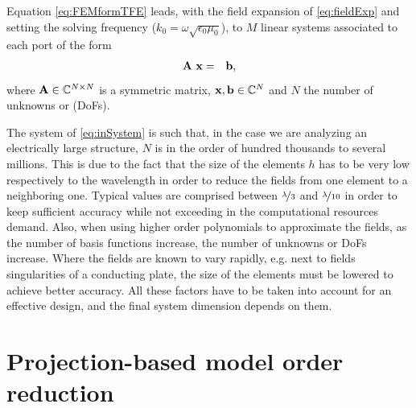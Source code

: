 \par Equation \eqref{eq:FEMformTFE} leads, with the field expansion of \eqref{eq:fieldExp} and setting the solving frequency ($k_0 = \omega\sqrt{\epsilon_0 \mu_0}$), to $M$ linear systems associated to each port of the form \cite{JinFEME,PelosiCoccioliSelleriQFEEF}
\begin{eqnarray}
\label{eq:inSystem}
\mat{A} \ \vect{x}  & = & \vect{b},
\end{eqnarray} where $\mathbf{A} \in \mathbb{C}^{N \times N}$ is a symmetric matrix, $\vect{x}, \vect{b} \in \mathbb{C}^{N}$ and $N$ the number of unknowns or  (DoFs).
\par The system of \eqref{eq:inSystem} is such that, in the case we are analyzing an electrically large structure, $N$ is in the order of hundred thousands to several millions. This is due to the fact that the size of the elements $h$ has to be very low respectively to the wavelength in order to reduce the fields  from one element to a neighboring one. Typical values are comprised between $\nicefrac{\lambda}{3}$ and $\nicefrac{\lambda}{10}$ in order to keep sufficient accuracy while not exceeding in the computational resources demand. Also, when using higher order polynomials to approximate the fields, as the number of basis functions increase, the number of unknowns or DoFs increase. Where the fields are known to vary rapidly, e.g. next to fields singularities of a conducting plate, the size of the elements must be lowered to achieve better accuracy. All these factors have to be taken into account for an effective design, and the final system dimension depends on them.
\section{Projection-based model order reduction}

